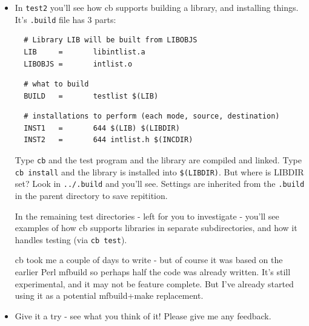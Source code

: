 \documentclass[handout]{beamer}
\begin{document}
\begin{frame}[fragile]
  \begin{itemize}

  \item
  In \verb+test2+ you'll see how \alert{cb} supports building a library,
  and installing things.  It's \verb+.build+ file has 3 parts:

\tiny
\begin{verbatim}
  # Library LIB will be built from LIBOBJS
  LIB     =       libintlist.a
  LIBOBJS =       intlist.o
\end{verbatim}

\pause
\begin{verbatim}
  # what to build
  BUILD   =       testlist $(LIB)
\end{verbatim}

\pause
\begin{verbatim}
  # installations to perform (each mode, source, destination)
  INST1   =       644 $(LIB) $(LIBDIR)
  INST2   =       644 intlist.h $(INCDIR)
\end{verbatim}
\small

  \pitem
  Type \verb+cb+ and the test program and the library are compiled
  and linked.  Type \verb+cb install+ and the library is installed
  into \verb+$(LIBDIR)+.  But where is LIBDIR set?  Look in
  \verb+../.build+ and you'll see.  Settings are inherited from
  the \verb+.build+ in the parent directory to save repitition.

  \pitem
  In the remaining test directories - left for you to investigate -
  you'll see examples of how \alert{cb} supports libraries in separate
  subdirectories,
  and how it handles testing (via \verb+cb test+).

  \pitem
  \alert{cb} took me a couple of days to write - but of course it was
  based on the earlier Perl \alert{mfbuild} so perhaps half the code
  was already written.  It's still experimental, and it may not be
  feature complete.  But I've already started using it
  as a potential \alert{mfbuild+make} replacement.
  
  \item
  Give it a try - see what you think of it!  Please give me any feedback.

  \end{itemize}
\end{frame}
\end{document}
